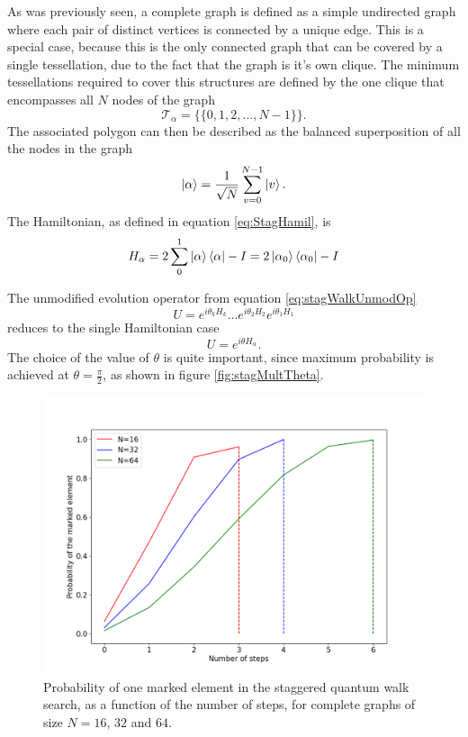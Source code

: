 \documentclass[../../dissertation.tex]{subfiles}
\begin{document}
As was previously seen, a complete graph is defined as a simple undirected
graph where each pair of distinct vertices is connected by a unique edge.  This
is a special case, because this is the only connected graph that can be covered
by a single tessellation, due to the fact that the graph is it's own clique. The
minimum tessellations required to cover this structures are defined by the one
clique that encompasses all $N$ nodes of the graph
\begin{equation}
	\mathscr{T}_{\alpha} = \{\{0,1,2,...,N-1\}\}.
\end{equation}
The associated polygon can then be described as the balanced superposition of
all the nodes in the graph
\begin{equation}
	\ket{\alpha} = \frac{1}{\sqrt{N}} \sum_{v=0}^{N-1} \ket{v}.
\end{equation}
The Hamiltonian, as defined in equation \eqref{eq:StagHamil}, is 
\begin{equation}
	H_\alpha = 2\sum_0^1\ket{\alpha}\bra{\alpha} - I = 2\ket{\alpha_0}\bra{\alpha_0} - I
\end{equation}\par
The unmodified evolution operator from equation \eqref{eq:stagWalkUnmodOp}
\begin{equation}
	U = e^{i\theta_{k}H_{k}}...e^{i\theta_{2}H_{2}}e^{i\theta_{1}H_{1}}
\end{equation}
reduces to the single Hamiltonian case
\begin{equation}
	U = e^{i\theta H_\alpha}.
	\label{eq:stagQWSearchUnmodEvo1}
\end{equation}
The choice of the value of $\theta$ is quite important, since maximum probability
is achieved at $\theta = \frac{\pi}{2}$, as shown in figure
\ref{fig:stagMultTheta}.
\begin{figure}[!h]
	\centering
	\includegraphics[scale=0.40]{img/StagQuantumWalk/Search/163264.png}
	\caption{Probability of one marked element in the staggered quantum walk search, as a function of the number of steps, for complete graphs of size $N=16$, $32$ and $64$.}
	\label{fig:StagSearch}
\end{figure}\par
\end{document}
